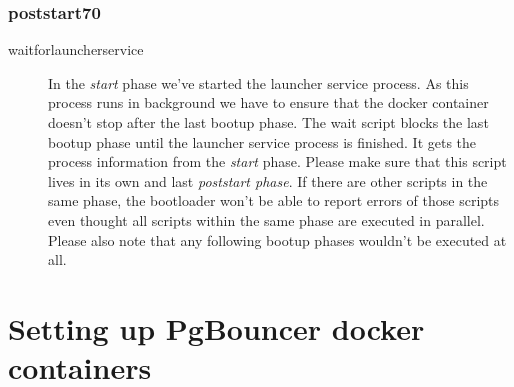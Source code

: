 			\subsubsection{poststart70}
			\begin{description}
				\item[waitforlauncherservice] In the \emph{start} phase we've started the launcher service process. As this process runs in background we have to ensure that the docker container doesn't stop after the last bootup phase. The wait script blocks the last bootup phase until the launcher service process is finished. It gets the process information from the \emph{start} phase. Please make sure that this script lives in its own and last \emph{poststart phase}. If there are other scripts in the same phase, the bootloader won't be able to report errors of those scripts even thought all scripts within the same phase are executed in parallel. Please also note that any following bootup phases wouldn't be executed at all.
			\end{description}

	\section{Setting up PgBouncer docker containers}
	